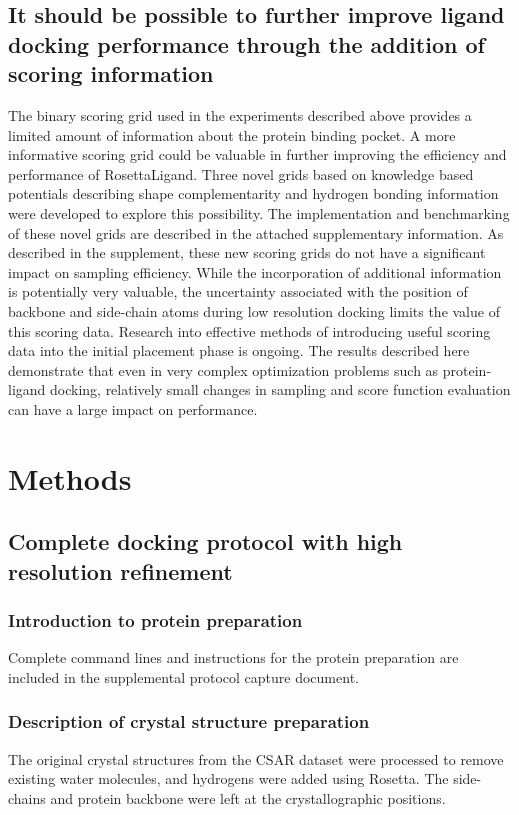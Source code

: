 \subsection{It should be possible to further improve ligand docking performance through the addition of scoring information}
The binary scoring grid used in the experiments described above provides a limited amount of information about the protein binding pocket.
A more informative scoring grid could be valuable in further improving the efficiency and performance of RosettaLigand.
Three novel grids based on knowledge based potentials describing shape complementarity and hydrogen bonding information were developed to explore this possibility.
The implementation and benchmarking of these novel grids are described in the attached supplementary information. 
As described in the supplement, these new scoring grids do not have a significant impact on sampling efficiency.
While the incorporation of additional information is potentially very valuable, the uncertainty associated with the position of backbone and side-chain atoms during low resolution docking limits the value of this scoring data.
Research into effective methods of introducing useful scoring data into the initial placement phase is ongoing.
The results described here demonstrate that even in very complex optimization problems such as protein-ligand docking, relatively small changes in sampling and score function evaluation can have a  large impact on performance. 

\section{Methods}
\subsection{Complete docking protocol with high resolution refinement}
\subsubsection{Introduction to protein preparation}
Complete command lines and instructions for the protein preparation are included in the supplemental protocol capture document.

\subsubsection{Description of crystal structure preparation}
The original crystal structures from the CSAR dataset were processed to remove existing water molecules, and hydrogens were added using Rosetta.
The side-chains and protein backbone were left at the crystallographic positions.

